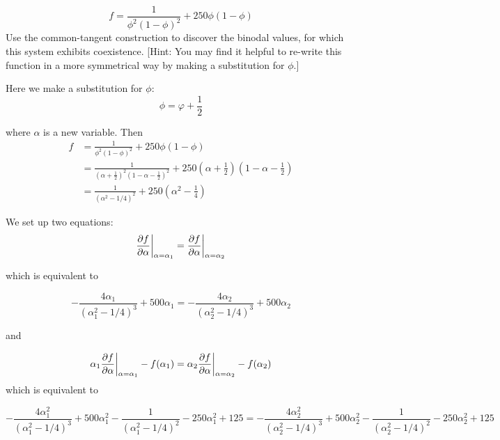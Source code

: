\documentclass[11pt]{article}
\begin{document}
\begin{equation}
    f = \frac{1}{\phi^2(1-\phi)^2} + 250\phi(1-\phi)
\end{equation}
Use the common-tangent construction to discover the binodal values, for which this system exhibits coexistence.
[Hint: You may find it helpful to re-write this function in a more symmetrical way by making a substitution for $\phi$.]

\solution
Here we make a substitution for $\phi$:
\begin{equation}
    \phi = \varphi + \frac{1}{2}
\end{equation}

where $\alpha$ is a new variable. Then
\begin{align*}
    f &= \frac{1}{\phi^2(1-\phi)^2} + 250\phi(1-\phi) \\
      &= \frac{1}{\left(\alpha + \frac{1}{2}\right)^2\left(1 - \alpha - \frac{1}{2}\right)^2} + 250\left(\alpha + \frac{1}{2}\right)\left(1 - \alpha - \frac{1}{2}\right) \\
      &= \frac{1}{(\alpha^2-1/4)^2} + 250\left(\alpha^2 - \frac{1}{4}\right)
\end{align*}

We set up two equations:
\begin{equation}
    \frac{\partial f}{\partial \alpha}\biggr|_{\substack{\alpha=\alpha_1}} = \frac{\partial f}{\partial \alpha}\biggr|_{\substack{\alpha=\alpha_2}}
\end{equation}

which is equivalent to

\begin{equation}
    -\frac{4\alpha_1}{(\alpha_1^2-1/4)^3} + 500\alpha_1 = -\frac{4\alpha_2}{(\alpha_2^2-1/4)^3} + 500\alpha_2
\end{equation}

and 

\begin{equation}
    \alpha_1\frac{\partial f}{\partial \alpha}\biggr|_{\substack{\alpha=\alpha_1}}-f(\alpha_1) = \alpha_2\frac{\partial f}{\partial \alpha}\biggr|_{\substack{\alpha=\alpha_2}} - f(\alpha_2)
\end{equation}
which is equivalent to

\begin{equation}
    -\frac{4\alpha_1^2}{(\alpha_1^2-1/4)^3} + 500\alpha_1^2 - \frac{1}{(\alpha_1^2-1/4)^2} - 250\alpha_1^2 + 125 = -\frac{4\alpha_2^2}{(\alpha_2^2-1/4)^3} + 500\alpha_2^2 - \frac{1}{(\alpha_2^2-1/4)^2} - 250\alpha_2^2 + 125
\end{equation}
\end{document}
